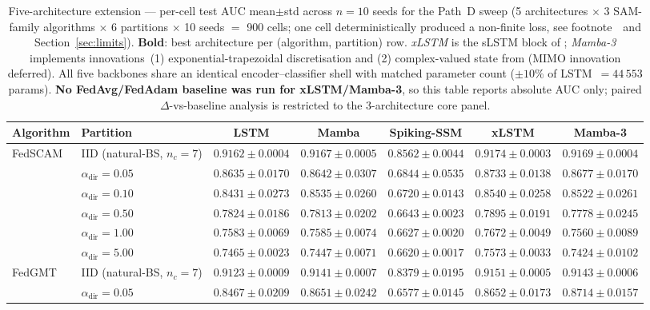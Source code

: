 \documentclass[journal]{IEEEtran}
\newcommand{\alphadir}{\ensuremath{\alpha_{\mathrm{dir}}}}
\begin{document}
\begin{table}[t]
\caption{Five-architecture extension --- per-cell test AUC mean$\pm$std across $n{=}10$ seeds for the Path~D sweep (5 architectures $\times$ 3 SAM-family algorithms $\times$ 6 partitions $\times$ 10 seeds $=$ 900 cells; one cell deterministically produced a non-finite loss, see footnote~\dag\ and Section~\ref{sec:limits}). \textbf{Bold}: best architecture per (algorithm, partition) row. \emph{xLSTM} is the sLSTM block of \cite{Beck2024_xLSTM}; \emph{Mamba-3} implements innovations~(1) exponential-trapezoidal discretisation and (2) complex-valued state from \cite{Lahoti2026_Mamba3} (MIMO innovation deferred). All five backbones share an identical encoder--classifier shell with matched parameter count ($\pm10\%$ of LSTM~$=44\,553$ params). \textbf{No FedAvg/FedAdam baseline was run for xLSTM/Mamba-3}, so this table reports absolute AUC only; paired $\Delta$-vs-baseline analysis is restricted to the 3-architecture core panel.}
\label{tab:five-arch}
\centering
\small
\begin{tabular}{@{}llccccc@{}}
\toprule
Algorithm & Partition & LSTM & Mamba & Spiking-SSM & xLSTM & Mamba-3 \\
\midrule
FedSCAM & IID (natural-BS, $n_c{=}7$) & $0.9162{\pm}0.0004$ & $0.9167{\pm}0.0005$ & $0.8562{\pm}0.0044$ & $\mathbf{0.9174{\pm}0.0003}$ & $0.9169{\pm}0.0004$ \\
 & $\alphadir{=}0.05$ & $0.8635{\pm}0.0170$ & $0.8642{\pm}0.0307$ & $0.6844{\pm}0.0535$ & $\mathbf{0.8733{\pm}0.0138}$ & $0.8677{\pm}0.0170$ \\
 & $\alphadir{=}0.10$ & $0.8431{\pm}0.0273$ & $0.8535{\pm}0.0260$ & $0.6720{\pm}0.0143$ & $\mathbf{0.8540{\pm}0.0258}$ & $0.8522{\pm}0.0261$ \\
 & $\alphadir{=}0.50$ & $0.7824{\pm}0.0186$ & $0.7813{\pm}0.0202$ & $0.6643{\pm}0.0023$ & $\mathbf{0.7895{\pm}0.0191}$ & $0.7778{\pm}0.0245$ \\
 & $\alphadir{=}1.00$ & $0.7583{\pm}0.0069$ & $0.7585{\pm}0.0074$ & $0.6627{\pm}0.0020$ & $\mathbf{0.7672{\pm}0.0049}$ & $0.7560{\pm}0.0089$ \\
 & $\alphadir{=}5.00$ & $0.7465{\pm}0.0023$ & $0.7447{\pm}0.0071$ & $0.6620{\pm}0.0017$ & $\mathbf{0.7573{\pm}0.0033}$ & $0.7424{\pm}0.0102$ \\
\midrule
FedGMT & IID (natural-BS, $n_c{=}7$) & $0.9123{\pm}0.0009$ & $0.9141{\pm}0.0007$ & $0.8379{\pm}0.0195$ & $\mathbf{0.9151{\pm}0.0005}$ & $0.9143{\pm}0.0006$ \\
 & $\alphadir{=}0.05$ & $0.8467{\pm}0.0209$ & $0.8651{\pm}0.0242$ & $0.6577{\pm}0.0145$ & $0.8652{\pm}0.0173$ & $\mathbf{0.8714{\pm}0.0157}$ \\

\end{tabular}
\end{table}
\end{document}
